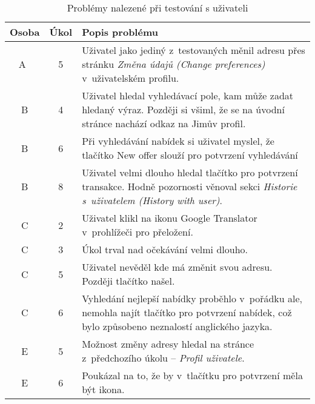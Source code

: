 \begin{table}[h]
    \caption{Problémy nalezené při testování s uživateli}\label{tab:test-results}
    \begin{tabulary}{1.0\textwidth}{|c|c|L|}
        \hline
        \textbf{Osoba} & \textbf{Úkol} & \textbf{Popis problému} \\ \hline\hline
        A~& 5 & Uživatel jako jediný z~testovaných měnil adresu přes stránku \textit{Změna údajů (Change preferences)} v~uživatelském profilu. \\ \hline

        B & 4 & Uživatel hledal vyhledávací pole, kam může zadat hledaný výraz. Později si všiml, že se na úvodní stránce nachází odkaz na Jimův profil. \\ \hline
        B & 6 & Při vyhledávání nabídek si uživatel myslel, že tlačítko New offer slouží pro potvrzení vyhledávání \\ \hline
        B & 8 & Uživatel velmi dlouho hledal tlačítko pro potvrzení transakce. Hodně pozornosti věnoval sekci \textit{Historie s~uživatelem (History with user)}. \\ \hline

        C & 2 & Uživatel klikl na ikonu Google Translator v~prohlížeči pro přeložení.  \\ \hline
        C & 3 & Úkol trval nad očekávání velmi dlouho.  \\ \hline
        C & 5 & Uživatel nevěděl kde má změnit svou adresu. Později tlačítko našel.  \\ \hline
        C & 6 & Vyhledání nejlepší nabídky proběhlo v~pořádku ale, nemohla najít tlačítko pro potvrzení nabídek, což bylo způsobeno neznalostí anglického jazyka. \\ \hline

        E & 5 & Možnost změny adresy hledal na stránce z~předchozího úkolu -- \textit{Profil uživatele}.  \\ \hline
        E & 6 & Poukázal na to, že by v~tlačítku pro potvrzení měla být ikona.  \\ \hline
    \end{tabulary}
\end{table}
